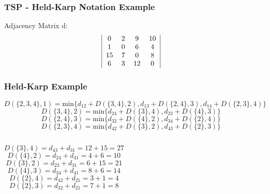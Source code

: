 \documentclass{beamer}
\begin{document}
\begin{frame}
\frametitle{TSP - Held-Karp Notation Example}

Adjacency Matrix d:
\[
\begin{tabular}{|cccc|}
0 & 2 & 9 & 10 \\
1 & 0 & 6 & 4 \\
15 & 7 & 0 & 8 \\
6 & 3 & 12 & 0
\end{tabular}
\]

\begin{itemize}
\end{itemize}



\end{frame}
\begin{frame}
\frametitle{Held-Karp Example}



$$D(\{2,3,4\},1)=\text{min}\{d_{12} + D(\{3,4\},2), d_{13} + D(\{2,4\},3), d_{14} + D(\{2,3\},4)\}$$
\pause
$$D(\{3,4\},2) = \text{min}\{d_{24} + D(\{3\},4), d_{23} + D(\{4\},3)\}$$
$$ D(\{2,4\},3) = \text{min}\{d_{32} + D(\{4\},2),  d_{34} + D(\{2\},4)\}$$
$$ D(\{2,3\},4) =  \text{min}\{d_{42} + D(\{3\},2),    d_{43} + D(\{2\},3)\}$$

\pause
\begin{columns}[c]
$$D(\{3\},4) = d_{43} + d_{31} = 12+15 = 27$$
$$D(\{4\},2) = d_{24} + d_{41} = 4+6 = 10$$
$$D(\{3\},2) = d_{23} + d_{31} = 6+15 = 21$$
$$D(\{4\},3) = d_{34} + d_{41} = 8+6 = 14$$
$$D(\{2\},4) = d_{42} + d_{21} = 3+1 = 4$$
$$D(\{2\},3) = d_{32} + d_{21} = 7+1 = 8$$
\end{columns}

\end{frame}
\end{document}
